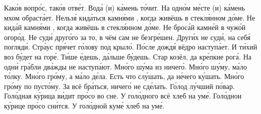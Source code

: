 \documentclass[a4paper]{article}
\begin{document}
              {Како́в вопро́с, тако́в отве́т.}
         {Вода́ (и) ка́мень то́чит.}
         {На одно́м ме́сте (и) ка́мень мхом
         обраста́ет.}
       {Нельзя́ кида́ться камня́ми , когда живёшь
            в стекля́нном до́ме.
       \mitem Не кида́й камня́ми , когда живёшь
            в стекля́нном до́ме.
        \mitem Не броса́й камне́й в чужо́й огоро́д.
        \mitem Не суди́ друго́го за то, в чём сам не безгре́шен.
        \mitem Други́х не суди́, на себя́ погляди́.}
{Стра́ус пря́чет го́лову под крыло́.}
         {По́сле дождя́ вёдро наступа́ет.
         }
         {
         И ти́хий воз бу́дет на горе́.
         \mitem Ти́ше е́дешь, да́льше бу́дешь.
         }
         {Стар козёл, да кре́пкие рога́.}
{На одни́ гра́бли два́жды не наступа́ют.}
        {Мно́го шу́ма из ничего́.
        \mitem Мно́го шу́му, ма́ло то́лку.
        \mitem Мно́го гро́му, а ма́ло де́ла.
        \mitem Есть что слу́шать, да не́чего ку́шать.
        \mitem Мно́го гро́му по пусто́му.
        \mitem За всё бра́ться, ничего́ не сде́лать.}
        {Го́лод лу́чший по́вар.
        }
         {Голо́дная ку́рица ви́дит про́со во сне.
        \mitem У голо́дного всё хлеб на уме́.
        \mitem Голо́днои ку́рице про́со сни́тся.
        \mitem У голо́дной куме́ хлеб на уме́.
        }
\end{document}
